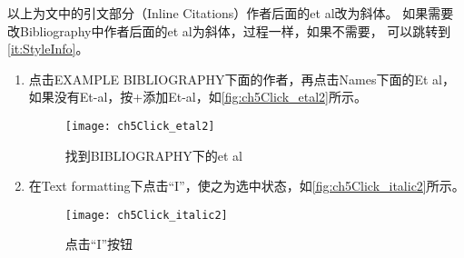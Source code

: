 \documentclass[cn,11pt,chinese]{elegantbook}
\begin{document}
			 以上为文中的引文部分（Inline Citations）作者后面的et al改为斜体。
			 如果需要改Bibliography中作者后面的et al为斜体，过程一样，如果不需要，
			 可以跳转到\cref{it:StyleInfo}。
			 \begin{enumerate}
				 \item 点击EXAMPLE BIBLIOGRAPHY下面的作者，再点击Names下面的Et al，
				 如果没有Et-al，按+添加Et-al，如\autoref{fig:ch5Click_etal2}所示。
			 		\begin{figure}[htbp]
						\centering
						\texttt{[image: ch5Click\_etal2]}
						\caption{找到BIBLIOGRAPHY下的et al}
						\label{fig:ch5Click_etal2}
					\end{figure}
				\item 在Text formatting下点击“I”，使之为选中状态，如\autoref{fig:ch5Click_italic2}所示。
					\begin{figure}[htbp]
						\centering
						\texttt{[image: ch5Click\_italic2]}
						\caption{点击“I”按钮}
						\label{fig:ch5Click_italic2}
					\end{figure}
				\end{enumerate}	
\end{document}
